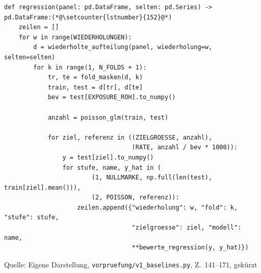 \documentclass[12pt,a4paper]{article}
\newcommand{\tabquelle}[1][Eigene Darstellung]{%
  \par\setlength{\parskip}{0pt}\vspace{3pt}%
  {\setstretch{1}\fontsize{9pt}{11pt}\selectfont\raggedright Quelle: #1\par}%
}
\begin{document}
\begin{quellcode}[htbp]
\caption{Beide Baseline-Stufen über dieselben 50 Läufe}
\label{lst:baselinelauf}\vspace{-3.5pt}
\begin{lstlisting}[style=pythonstil,firstnumber=141]
def regression(panel: pd.DataFrame, selten: pd.Series) -> pd.DataFrame:(*@\setcounter{lstnumber}{152}@*)
    zeilen = []
    for w in range(WIEDERHOLUNGEN):
        d = wiederholte_aufteilung(panel, wiederholung=w, selten=selten)
        for k in range(1, N_FOLDS + 1):
            tr, te = fold_masken(d, k)
            train, test = d[tr], d[te]
            bev = test[EXPOSURE_ROH].to_numpy()

            anzahl = poisson_glm(train, test)

            for ziel, referenz in ((ZIELGROESSE, anzahl),
                                   (RATE, anzahl / bev * 1000)):
                y = test[ziel].to_numpy()
                for stufe, name, y_hat in (
                        (1, NULLMARKE, np.full(len(test), train[ziel].mean())),
                        (2, POISSON, referenz)):
                    zeilen.append({"wiederholung": w, "fold": k, "stufe": stufe,
                                   "zielgroesse": ziel, "modell": name,
                                   **bewerte_regression(y, y_hat)})
\end{lstlisting}
\tabquelle[Eigene Darstellung, \texttt{vorpruefung/v1\_baselines.py}, Z.~141--171, gekürzt]
\end{quellcode}
 
\end{document}
